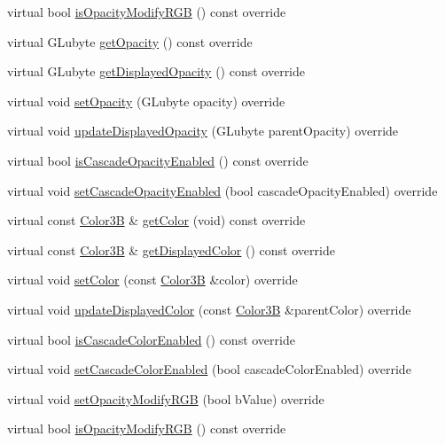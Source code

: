 \begin{DoxyCompactItemize}
\item 
virtual bool \hyperlink{class____NodeRGBA_a60d28606b0a253ad511df43a868fa08c}{is\+Opacity\+Modify\+R\+GB} () const override
\item 
virtual G\+Lubyte \hyperlink{class____NodeRGBA_a48a5a78aea7c307ccfbe8c10e053b7c8}{get\+Opacity} () const override
\item 
virtual G\+Lubyte \hyperlink{class____NodeRGBA_adbf1aa17734836db2096f2901d81d304}{get\+Displayed\+Opacity} () const override
\item 
virtual void \hyperlink{class____NodeRGBA_aa0ac4f9dca25f519f175e668ba4f3306}{set\+Opacity} (G\+Lubyte opacity) override
\item 
virtual void \hyperlink{class____NodeRGBA_a428c41148bb3d1fe27d7eac80bb6df59}{update\+Displayed\+Opacity} (G\+Lubyte parent\+Opacity) override
\item 
virtual bool \hyperlink{class____NodeRGBA_a421ef9c26c9860deb23184727d573415}{is\+Cascade\+Opacity\+Enabled} () const override
\item 
virtual void \hyperlink{class____NodeRGBA_a10fe85e705700fbe2bd28da1a17eda68}{set\+Cascade\+Opacity\+Enabled} (bool cascade\+Opacity\+Enabled) override
\item 
virtual const \hyperlink{structColor3B}{Color3B} \& \hyperlink{class____NodeRGBA_a730149ff787a7a86d78a5c0d0aecddda}{get\+Color} (void) const override
\item 
virtual const \hyperlink{structColor3B}{Color3B} \& \hyperlink{class____NodeRGBA_ae17a9077b86673cb75f799cb4f6c8a1d}{get\+Displayed\+Color} () const override
\item 
virtual void \hyperlink{class____NodeRGBA_adaec184f0ee740557ffddaece7ece996}{set\+Color} (const \hyperlink{structColor3B}{Color3B} \&color) override
\item 
virtual void \hyperlink{class____NodeRGBA_a7b792b469020beebcd515a2eacba90f7}{update\+Displayed\+Color} (const \hyperlink{structColor3B}{Color3B} \&parent\+Color) override
\item 
virtual bool \hyperlink{class____NodeRGBA_a24f2ae00f1994d6601ce8e1f089dafe1}{is\+Cascade\+Color\+Enabled} () const override
\item 
virtual void \hyperlink{class____NodeRGBA_a07c6d23e55cc2ba21115d2b93ef25bcd}{set\+Cascade\+Color\+Enabled} (bool cascade\+Color\+Enabled) override
\item 
virtual void \hyperlink{class____NodeRGBA_a2baa7449894e58c0bc78e749058b9c0e}{set\+Opacity\+Modify\+R\+GB} (bool b\+Value) override
\item 
virtual bool \hyperlink{class____NodeRGBA_a60d28606b0a253ad511df43a868fa08c}{is\+Opacity\+Modify\+R\+GB} () const override
\end{DoxyCompactItemize}

